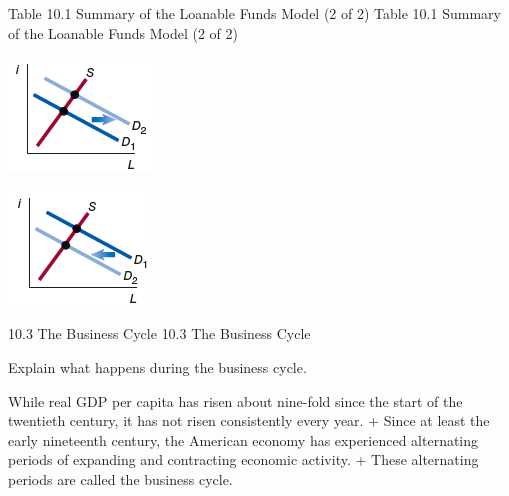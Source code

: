 \documentclass[
  12pt,
  ignorenonframetext,
]{beamer}
\begin{document}
\begin{frame}{Table 10.1 Summary of the Loanable Funds Model (2 of 2)}
\label{table-10.1-summary-of-the-loanable-funds-model-2-of-2}
Table 10.1 Summary of the Loanable Funds Model (2 of 2)

\includegraphics[width=\textwidth,height=0.99\textheight]{imgs3/img_slide32a.png}

\includegraphics[width=\textwidth,height=0.99\textheight]{imgs3/img_slide32b.png}
\end{frame}

\begin{frame}{10.3 The Business Cycle}
\label{the-business-cycle}
10.3 The Business Cycle

Explain what happens during the business cycle.

While real GDP per capita has risen about nine-fold since the start of
the twentieth century, it has not risen consistently every year. + Since
at least the early nineteenth century, the American economy has
experienced alternating periods of expanding and contracting economic
activity. + These alternating periods are called the business cycle.
\end{frame}
\end{document}
